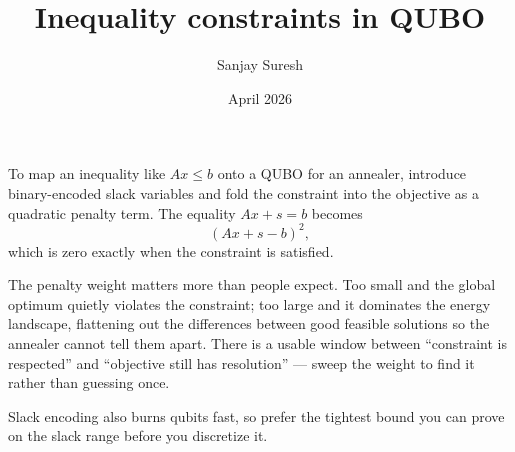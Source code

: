 \documentclass[11pt]{article}
\title{\textbf{Inequality constraints in QUBO}}
\author{Sanjay Suresh}
\date{April 2026}
\begin{document}
\maketitle

To map an inequality like $Ax \le b$ onto a QUBO for an annealer, introduce binary-encoded slack
variables and fold the constraint into the objective as a quadratic penalty term. The equality
$Ax + s = b$ becomes
\[ (Ax + s - b)^2, \]
which is zero exactly when the constraint is satisfied.

The penalty weight matters more than people expect. Too small and the global optimum quietly
violates the constraint; too large and it dominates the energy landscape, flattening out the
differences between good feasible solutions so the annealer cannot tell them apart. There is a
usable window between ``constraint is respected'' and ``objective still has resolution'' --- sweep
the weight to find it rather than guessing once.

Slack encoding also burns qubits fast, so prefer the tightest bound you can prove on the slack range
before you discretize it.
\end{document}
